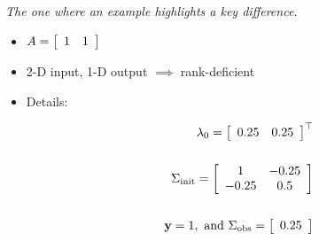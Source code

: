 \begin{frame}{\it The one where an example highlights a key difference.}

\begin{itemize}
\item $A=\mat{cc}{1 & 1}$

\bigskip
\item 2-D input, 1-D output $\implies$ rank-deficient

\bigskip
\item Details:

\begin{equation*}
\begin{split}
	\initialMean = \mat{cc}{0.25 & 0.25}^\top \\ \\
  \initialCov = \mat{cc}{1 & -0.25 \\ -0.25 & 0.5} \\ \\
  \observedMean=1, \text{ and } \observedCov = \mat{c}{0.25}
\end{split}
\end{equation*}

\end{itemize}
\end{frame}

